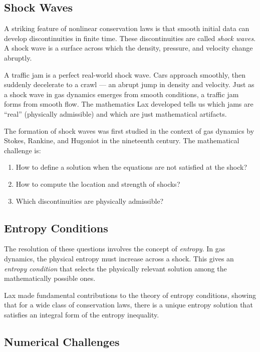 \subsection{Shock Waves}

A striking feature of nonlinear conservation laws is that smooth initial data can develop discontinuities in finite time. These discontinuities are called \emph{shock waves}. A shock wave is a surface across which the density, pressure, and velocity change abruptly.

\begin{analogy}
A traffic jam is a perfect real-world shock wave. Cars approach smoothly, then suddenly decelerate to a crawl --- an abrupt jump in density and velocity. Just as a shock wave in gas dynamics emerges from smooth conditions, a traffic jam forms from smooth flow. The mathematics Lax developed tells us which jams are ``real'' (physically admissible) and which are just mathematical artifacts.
\end{analogy}

The formation of shock waves was first studied in the context of gas dynamics by Stokes, Rankine, and Hugoniot in the nineteenth century. The mathematical challenge is:
\begin{enumerate}
\item How to define a solution when the equations are not satisfied at the shock?
\item How to compute the location and strength of shocks?
\item Which discontinuities are physically admissible?
\end{enumerate}

\subsection{Entropy Conditions}

The resolution of these questions involves the concept of \emph{entropy}. In gas dynamics, the physical entropy must increase across a shock. This gives an \emph{entropy condition} that selects the physically relevant solution among the mathematically possible ones.

Lax made fundamental contributions to the theory of entropy conditions, showing that for a wide class of conservation laws, there is a unique entropy solution that satisfies an integral form of the entropy inequality.

\subsection{Numerical Challenges}

